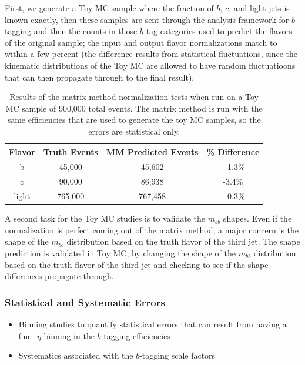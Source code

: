 First, we generate a Toy MC sample where the fraction of $b$, $c$, and light 
jets is known exactly, then these samples are sent through the analysis framework for $b$-tagging and 
then the counts in those $b$-tag categories used to predict the flavors of the original sample; 
the input and output flavor normalizations match to within a few percent (the difference results from statistical fluctuations, 
since the kinematic distributions of the Toy MC are allowed to have random fluctuatioons that can then propagate through to the final result).  
\begin{table}
\centering
\caption{Results of the matrix method normalization tests when run on a Toy MC sample of 
    900,000 total events.  The matrix method is run with the same efficiencies that
    are used to generate the toy MC samples, so the errors are statistical only.
    \label{tab:mm_toy_mc}   }
  \begin{tabular}{cccc}
     \hline \hline
     Flavor & Truth Events & MM Predicted Events & \% Difference  \\ \hline
     b   & 45,000 & 45,602 & +1.3\% \\
     c   & 90,000 & 86,938 & -3.4\% \\
     light & 765,000 & 767,458 & +0.3\% \\
     \hline     \end{tabular}
\end{table}

A second task for the Toy MC studies is to validate the $m_{bb}$ shapes.  Even if the normalization is perfect coming out of the matrix method, a major concern is the shape of the $m_{bb}$ distribution based on the truth flavor of the third jet.  The shape prediction is validated in Toy MC, by changing the shape of the $m_{bb}$ distribution based on the truth flavor of the third jet and checking to see if the shape differences propagate through.  



\subsubsection{Statistical and Systematic Errors}
\begin{itemize}
    \item Binning studies to quantify statistical errors that can result from having a fine \pt-$\eta$ binning in the $b$-tagging efficiencies
    \item Systematics associated with the $b$-tagging scale factors
\end{itemize}



